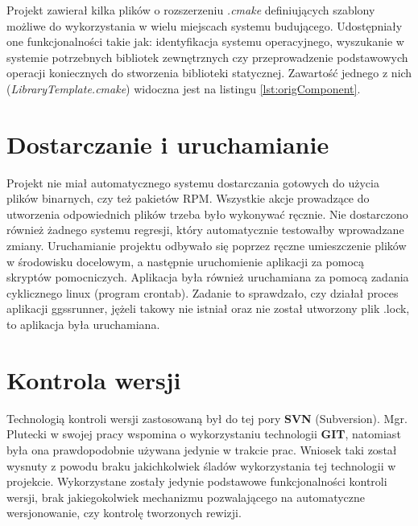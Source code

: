 Projekt zawierał kilka plików o rozszerzeniu \textit{.cmake} definiujących szablony możliwe do wykorzystania w wielu miejscach systemu budującego. Udostępniały one funkcjonalności takie jak: identyfikacja systemu operacyjnego, wyszukanie w systemie potrzebnych bibliotek zewnętrznych czy przeprowadzenie podstawowych operacji koniecznych do stworzenia biblioteki statycznej. Zawartość jednego z nich (\textit{LibraryTemplate.cmake}) widoczna jest na listingu \ref{lst:origComponent}.


\section{Dostarczanie i uruchamianie}

Projekt nie miał automatycznego systemu dostarczania gotowych do użycia plików binarnych, czy też pakietów RPM. Wszystkie akcje prowadzące do utworzenia odpowiednich plików trzeba było wykonywać ręcznie. Nie dostarczono również żadnego systemu regresji, który automatycznie testowałby wprowadzane zmiany. Uruchamianie projektu odbywało się poprzez ręczne umieszczenie plików w środowisku docelowym, a następnie uruchomienie aplikacji za pomocą skryptów pomocniczych. Aplikacja była również uruchamiana za pomocą zadania cyklicznego linux (program crontab). Zadanie to sprawdzało, czy działał proces aplikacji ggssrunner, jężeli takowy nie istniał oraz nie został utworzony plik .lock, to aplikacja była uruchamiana.

\section{Kontrola wersji}

Technologią kontroli wersji zastosowaną był do tej pory \textbf{SVN} (Subversion). Mgr. Plutecki w swojej pracy wspomina o wykorzystaniu technologii \textbf{GIT}, natomiast była ona prawdopodobnie używana jedynie w trakcie prac. Wniosek taki został wysnuty z powodu braku jakichkolwiek śladów wykorzystania tej technologii w projekcie. Wykorzystane zostały jedynie podstawowe funkcjonalności kontroli wersji, brak jakiegokolwiek mechanizmu pozwalającego na automatyczne wersjonowanie, czy kontrolę tworzonych rewizji.



